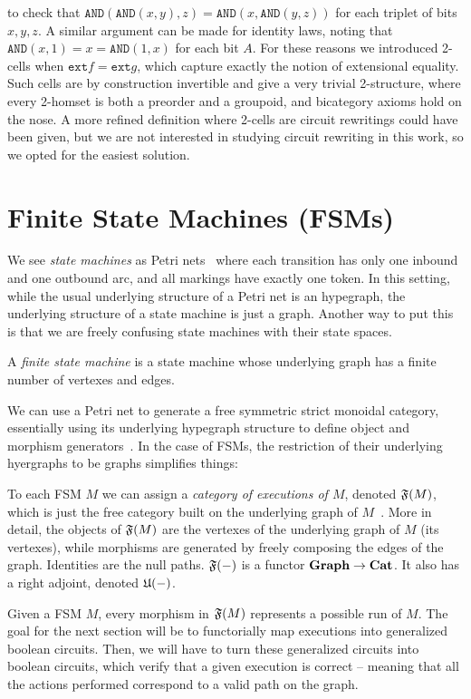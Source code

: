 \documentclass[preliminary,copyright,creativecommons,sharealike,noncommercial]{eptcs}
\begin{document}
to check that 
$\texttt{AND}(\texttt{AND}(x,y),z) = \texttt{AND}(x,\texttt{AND}(y,z))$
for each triplet of bits $x, y, z$. A similar argument can be made for identity 
laws, noting that $\texttt{AND}(x, 1) = x = \texttt{AND}(1,x)$ for each 
bit $A$. For these reasons we introduced 
2-cells when $\texttt{ext}f = \texttt{ext}g$, which capture exactly 
the notion of extensional equality. Such cells are by construction invertible 
and give a very trivial 2-structure, where every 2-homset is both 
a preorder and a groupoid, and bicategory axioms hold on the nose.
A more refined definition 
where 2-cells are circuit rewritings could have been given, 
but we are not interested in studying circuit rewriting in this 
work, so we opted for the easiest solution.
%
%
%
\section{Finite State Machines (FSMs)}\label{sec: finite state machines}
We see \emph{state machines} as Petri nets~\cite[Ch.2]{StateboxTeam2019a} where 
each transition has only one inbound and one outbound arc, 
and all markings have exactly one token. In this setting, while 
the usual underlying structure of a Petri net is an hypegraph,
the underlying structure of a state machine is just 
a graph. Another way to put this is that we are freely 
confusing state machines with their state spaces.
%
%
\begin{definition}
  A \emph{finite state machine} is a state machine whose
  underlying graph has a finite number of vertexes and edges.
\end{definition}
%
We can use a Petri net to generate a free symmetric strict monoidal 
category, essentially using its underlying hypegraph structure to define 
object and morphism generators~\cite{Genovese2019}. In the case of FSMs, the restriction 
of their underlying hyergraphs to be graphs simplifies things:
%
%
\begin{definition}
  To each FSM $M$ we can assign a \emph{category of executions 
  of $M$}, denoted $\mathfrak{F}(M)$, which is just the free category built 
  on the underlying graph of $M$~\cite[pp.49-51]{MacLane1978}. More in detail, the objects of $\mathfrak{F}(M)$
  are the vertexes of the underlying graph of $M$ (its vertexes), while morphisms 
  are generated by freely composing the edges of the graph. 
  Identities are the null paths. $\mathfrak{F}(-)$ is a functor $\textbf{Graph} \to \textbf{Cat}$. 
  It also has a right adjoint, denoted $\mathfrak{U}(-)$.
\end{definition}
%
Given a FSM $M$, every morphism in $\mathfrak{F}(M)$ represents a possible 
run of $M$. The goal for the next section will be to functorially map 
executions into generalized boolean circuits. Then, we will have to turn 
these generalized circuits into boolean circuits, which verify that a given 
execution is correct -- meaning that all the actions performed correspond to a valid path
on the graph. 
%
%
\end{document}
